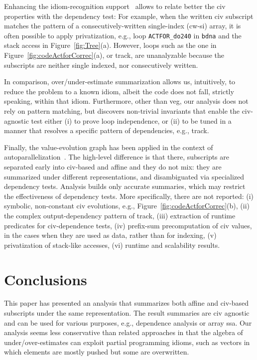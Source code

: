 \documentclass[10pt,nocopyrightspace]{sigplanconf}
\begin{document}
Enhancing the idiom-recognition support~\cite{PaduaDemDrInterproc} 
allows to relate better the {\sc civ} properties with the dependency test: 
For example, when the written {\sc civ} subscript matches the pattern 
of a consecutively-written single-index ({\sc cw-si}) array, it is often
possible to apply privatization, e.g., loop {\tt ACTFOR\_do240} in {\tt bdna}
and the stack access in Figure~\ref{fig:Tree}(a). 
%
However, loops such as the one in Figure~\ref{fig:codeActforCorrec}(a),
or {\sc track}, are unanalyzable because the subscripts are neither single 
indexed, nor consecutively written.  

In comparison, over/under-estimate summarization allows us,
intuitively, to reduce the problem to a known idiom, albeit
the code does not fall, strictly speaking, within that idiom.
Furthermore, other than {\sc veg}, our analysis does not rely
on pattern matching, but discovers non-trivial invariants that
enable the {\sc civ}-agnostic test either (i) to prove loop independence,
or (ii) to be tuned in a manner that resolves a specific pattern 
of dependencies, e.g., {\sc track}.

Finally, the value-evolution graph has been applied in the context of 
autoparallelization~\cite{VEG}.   The high-level difference is that there, 
subscripts are separated early into {\sc civ}-based and affine and they 
do not mix: they are summarized under different representations, 
and disambiguated via specialized dependency tests.
Analysis builds only accurate summaries, which may restrict the
effectiveness of dependency tests. 
More specifically, there are not reported:
  (i)   symbolic, non-constant {\sc civ} evolutions,
        e.g., Figure~\ref{fig:codeActforCorrec}(b),
 (ii) the complex output-dependency pattern of {\sc track},
(iii) extraction of runtime predicates for {\sc civ}-dependence tests,
 (iv) prefix-sum precomputation of {\sc civ} values, in the
        cases when they are used as data, rather than for indexing,
  (v) privatization of stack-like accesses, 
 (vi) runtime and scalability results.


\section{Conclusions}
\label{sec:Concl}

This paper has presented an analysis that summarizes both 
affine and {\sc civ}-based subscripts under the same 
representation. 
%
The result summaries are {\sc civ} agnostic and can be used for 
various  purposes, e.g., dependence analysis or array {\sc ssa}. 
%
Our analysis seems less conservative than related approaches 
in that the algebra of under/over-estimates can exploit partial 
programming idioms, such as vectors in which elements are mostly 
pushed but some are overwritten. 
\end{document}
